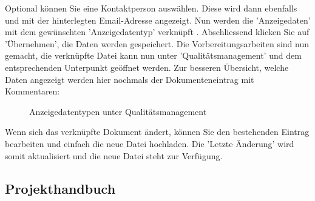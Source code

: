 Optional können Sie eine Kontaktperson  auswählen. Diese wird dann ebenfalls und mit der hinterlegten Email-Adresse angezeigt. Nun werden die 'Anzeigedaten' mit dem gewünschten 'Anzeigedatentyp' verknüpft . Abschliessend klicken Sie auf 'Übernehmen', die Daten werden gespeichert. Die Vorbereitungsarbeiten sind nun gemacht, die verknüpfte Datei kann nun unter 'Qualitätsmanagement' und dem entsprechenden Unterpunkt geöffnet werden. Zur besseren Übersicht, welche Daten angezeigt werden hier nochmals der Dokumenteneintrag mit Kommentaren:

\begin{figure}[H]
\caption{Anzeigedatentypen unter Qualitätsmanagement}
\end{figure}

Wenn sich das verknüpfte Dokument ändert, können Sie den bestehenden Eintrag bearbeiten und einfach die neue Datei hochladen. Die 'Letzte Änderung' wird somit aktualisiert und die neue Datei steht zur Verfügung.

\subsection{Projekthandbuch}

